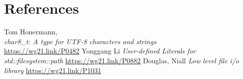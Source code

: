\documentclass[11pt]{article}
\begin{document}
\section{References}
\let\oldsection=\section
\renewcommand{\section}[2]{}%
\begin{thebibliography}{9}
    Tom Honermann,\\
    \emph{char8\_t: A type for UTF-8 characters and strings}\\
    \url{https://wg21.link/P0482}
    Yonggang Li\newline
    \emph{User-defined Literals for std::filesystem::path}\newline
    \url{https://wg21.link/P0882}
    Douglas, Niall\newline
    \emph{Low level file i/o library}\newline
    \url{https://wg21.link/P1031}
\end{thebibliography}
\let\section=\oldsection
\end{document}
